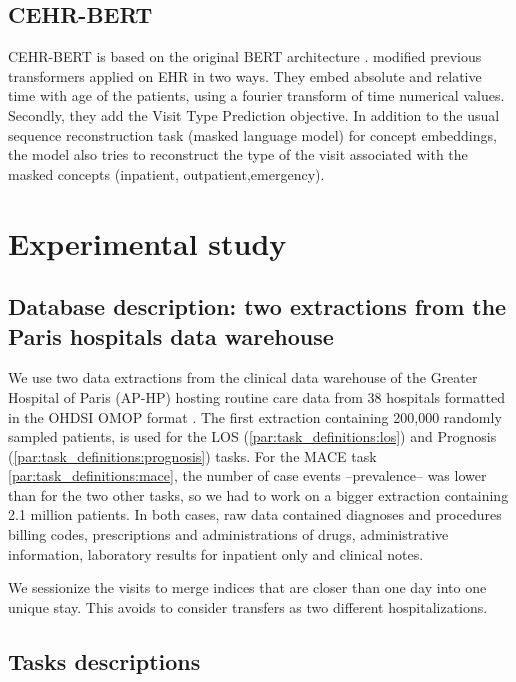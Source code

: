 \documentclass[french,12pt,twoside,a4paper]{book}
\begin{document}
\begin{appendices}
  \subsection{CEHR-BERT}\label{apd:pipelines:cehr_bert}

  CEHR-BERT is based on the original BERT architecture \citep{devlin2018bert}.
  \cite{pang2021cehr} modified previous transformers applied on EHR in two ways.
  They embed absolute and relative time with age of the patients, using a fourier
  transform of time numerical values. Secondly, they add the Visit Type Prediction
  objective. In addition to the usual sequence reconstruction task (masked
  language model) for concept embeddings, the model also tries to reconstruct the
  type of the visit associated with the masked concepts (inpatient,
  outpatient,emergency).

  \section{Experimental study}\label{apd:predictive_models:experimental_study}

  \subsection{Database description: two extractions from the Paris hospitals data warehouse}%
  \label{apd:database_description}

  We use two data extractions from the clinical data warehouse of the Greater
  Hospital of Paris (AP-HP) hosting routine care data from 38 hospitals formatted
  in the OHDSI OMOP format \citep{hripcsak2015observational}. The first extraction
  containing 200,000 randomly sampled patients, is used for the LOS
  (\ref{par:task_definitions:los}) and Prognosis
  (\ref{par:task_definitions:prognosis}) tasks. For the MACE task
  \ref{par:task_definitions:mace}, the number of case events --prevalence-- was
  lower than for the two other tasks, so we had to work on a bigger extraction
  containing 2.1 million patients. In both cases, raw data contained diagnoses and
  procedures billing codes, prescriptions and administrations of drugs,
  administrative information, laboratory results for inpatient only and clinical
  notes.

  We sessionize the visits to merge indices that are closer than one day into one
  unique stay. This avoids to consider transfers as two different hospitalizations.

  \subsection{Tasks
    descriptions}\label{apd:tasks:population_selection}


\end{appendices}
\end{document}
